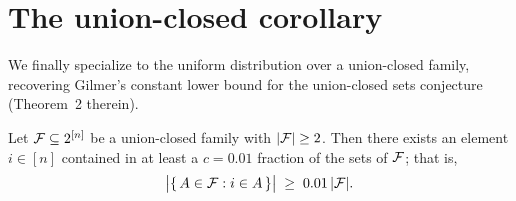 \section{The union-closed corollary}
\label{sec:frankl}

We finally specialize  to the uniform distribution over
a union-closed family, recovering Gilmer's constant lower bound for the
union-closed sets conjecture~\cite{gilmer2022unionclosed} (Theorem~2 therein).

\begin{theorem}
\label{thm:gilmer-frankl}
Let $\mathcal{F} \subseteq 2^{[n]}$ be a union-closed family with $|\mathcal{F}| \ge 2$. Then there
exists an element $i \in [n]$ contained in at least a $c = 0.01$ fraction of the
sets of $\mathcal{F}$; that is,
\begin{align*}
\bigl|\{\, A \in \mathcal{F} : i \in A \,\}\bigr| \;\ge\; 0.01\,|\mathcal{F}|.
\end{align*}
\end{theorem}

